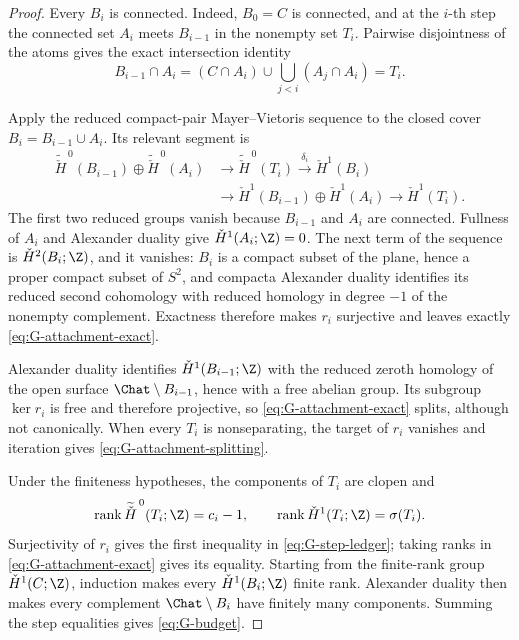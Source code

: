\begin{proof}
Every $B_i$ is connected.  Indeed, $B_0=C$ is connected, and at the
$i$-th step the connected set $A_i$ meets $B_{i-1}$ in the nonempty set
$T_i$.  Pairwise disjointness of the atoms gives the exact intersection
identity
\[
 B_{i-1}\cap A_i
 =
 (C\cap A_i)\cup\bigcup_{j<i}(A_j\cap A_i)
 =T_i .
\]

Apply the reduced compact-pair Mayer--Vietoris sequence to the closed cover
$B_i=B_{i-1}\cup A_i$.  Its relevant segment is
\[
\begin{split}
 \widetilde{\check H}^{\,0}(B_{i-1})
 \oplus\widetilde{\check H}^{\,0}(A_i)
 &\longrightarrow
 \widetilde{\check H}^{\,0}(T_i)
 \xrightarrow{\delta_i}
 \check H^1(B_i)\\
 &\longrightarrow
 \check H^1(B_{i-1})\oplus\check H^1(A_i)
 \longrightarrow
 \check H^1(T_i).
\end{split}
\]
The first two reduced groups vanish because $B_{i-1}$ and $A_i$ are
connected.  Fullness of $A_i$ and Alexander duality give
$\check H^1(A_i;\Z)=0$.  The next term of the sequence is
$\check H^2(B_i;\Z)$, and it vanishes: $B_i$ is a compact subset of the
plane, hence a proper compact subset of $S^2$, and compacta Alexander
duality identifies its reduced second cohomology with reduced homology in
degree $-1$ of the nonempty complement.  Exactness therefore makes $r_i$
surjective and leaves exactly \eqref{eq:G-attachment-exact}.

Alexander duality identifies $\check H^1(B_{i-1};\Z)$ with the reduced
zeroth homology of the open surface $\Chat\setminus B_{i-1}$, hence with a
free abelian group.  Its subgroup $\ker r_i$ is free and therefore
projective, so \eqref{eq:G-attachment-exact} splits, although not
canonically.  When every $T_i$ is nonseparating, the target of $r_i$
vanishes and iteration gives \eqref{eq:G-attachment-splitting}.

Under the finiteness hypotheses, the components of $T_i$ are clopen and
\[
 \operatorname{rank}\widetilde{\check H}^{\,0}(T_i;\Z)=c_i-1,
 \qquad
 \operatorname{rank}\check H^1(T_i;\Z)=\sigma(T_i).
\]
Surjectivity of $r_i$ gives the first inequality in
\eqref{eq:G-step-ledger}; taking ranks in
\eqref{eq:G-attachment-exact} gives its equality.  Starting from the
finite-rank group $\check H^1(C;\Z)$, induction makes every
$\check H^1(B_i;\Z)$ finite rank.  Alexander duality then makes every
complement $\Chat\setminus B_i$ have finitely many components.  Summing
the step equalities gives \eqref{eq:G-budget}.
\end{proof}

